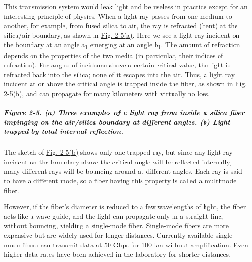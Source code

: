 \documentclass[b5paper,11pt]{memoir}
\begin{document}
This transmission system would leak light and be useless in practice
except for an interesting principle of physics. When a light ray passes
from one medium to another, for example, from fused silica to air, the
ray is refracted (bent) at the silica/air boundary, as shown in
\protect\hyperlink{0130661023_ch02lev1sec2.htmlux5cux23ch02fig05}{Fig.
2-5(a)}. Here we see a light ray incident on the boundary at an angle
{a}\textsubscript{1} emerging at an angle {b}\textsubscript{1}{.} The
amount of refraction depends on the properties of the two media (in
particular, their indices of refraction). For angles of incidence above
a certain critical value, the light is refracted back into the silica;
none of it escapes into the air. Thus, a light ray incident at or above
the critical angle is trapped inside the fiber, as shown in
\protect\hyperlink{0130661023_ch02lev1sec2.htmlux5cux23ch02fig05}{Fig.
2-5(b)}, and can propagate for many kilometers with virtually no loss.

\subparagraph[Figure 2-5. (a) Three examples of a light ray from inside
a silica fiber impinging on the air/silica boundary at different angles.
(b) Light trapped by total internal
reflection.]{\texorpdfstring{\protect\hypertarget{0130661023_ch02lev1sec2.htmlux5cux23ch02fig05}{}{}Figure
2-5. (a) Three examples of a light ray from inside a silica fiber
impinging on the air/silica boundary at different angles. (b) Light
trapped by total internal
reflection.}{Figure 2-5. (a) Three examples of a light ray from inside a silica fiber impinging on the air/silica boundary at different angles. (b) Light trapped by total internal reflection.}}


The sketch of
\protect\hyperlink{0130661023_ch02lev1sec2.htmlux5cux23ch02fig05}{Fig.
2-5(b)} shows only one trapped ray, but since any light ray incident on
the boundary above the critical angle will be reflected internally, many
different rays will be bouncing around at different angles. Each ray is
said to have a different {mode}, so a fiber having this property is
called a {multimode fiber}.

However, if the fiber's diameter is reduced to a few wavelengths of
light, the fiber acts like a wave guide, and the light can propagate
only in a straight line, without bouncing, yielding a {single-mode
fiber}. Single-mode fibers are more expensive but are widely used for
longer distances. Currently available single-mode fibers can transmit
data at 50 Gbps for 100 km without amplification. Even higher data rates
have been achieved in the laboratory for shorter distances.
\end{document}
